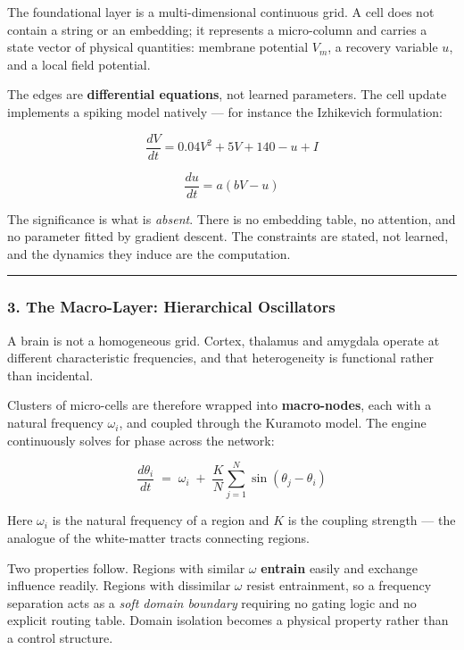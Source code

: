 \documentclass[
  11pt,
  a4paper,
]{article}
\begin{document}
The foundational layer is a multi-dimensional continuous grid. A cell
does not contain a string or an embedding; it represents a micro-column
and carries a state vector of physical quantities: membrane potential
\(V_m\), a recovery variable \(u\), and a local field potential.

The edges are \textbf{differential equations}, not learned parameters.
The cell update implements a spiking model natively --- for instance the
Izhikevich formulation:

\[
\frac{dV}{dt} = 0.04V^2 + 5V + 140 - u + I
\]

\[
\frac{du}{dt} = a(bV - u)
\]

The significance is what is \emph{absent}. There is no embedding table,
no attention, and no parameter fitted by gradient descent. The
constraints are stated, not learned, and the dynamics they induce are
the computation.

\begin{center}\rule{0.5\linewidth}{0.5pt}\end{center}

\subsubsection{3. The Macro-Layer: Hierarchical
Oscillators}\label{the-macro-layer-hierarchical-oscillators}

A brain is not a homogeneous grid. Cortex, thalamus and amygdala operate
at different characteristic frequencies, and that heterogeneity is
functional rather than incidental.

Clusters of micro-cells are therefore wrapped into \textbf{macro-nodes},
each with a natural frequency \(\omega_i\), and coupled through the
Kuramoto model. The engine continuously solves for phase across the
network:

\[
\frac{d\theta_i}{dt} \;=\; \omega_i \;+\; \frac{K}{N}\sum_{j=1}^{N} \sin(\theta_j - \theta_i)
\]

Here \(\omega_i\) is the natural frequency of a region and \(K\) is the
coupling strength --- the analogue of the white-matter tracts connecting
regions.

Two properties follow. Regions with similar \(\omega\) \textbf{entrain}
easily and exchange influence readily. Regions with dissimilar
\(\omega\) resist entrainment, so a frequency separation acts as a
\emph{soft domain boundary} requiring no gating logic and no explicit
routing table. Domain isolation becomes a physical property rather than
a control structure.
\end{document}
